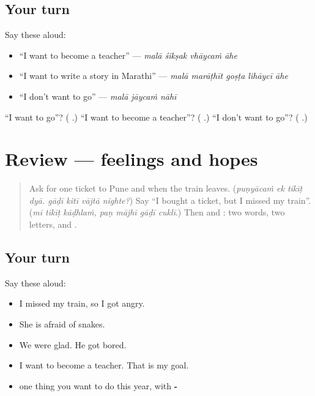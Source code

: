 \subsection*{Your turn}
Say these aloud:

\begin{itemize}
\raggedright
  \item \textquotedblleft{}I want to become a teacher\textquotedblright{} — \emph{malā śikṣak vhāycaṁ āhe}
  \item \textquotedblleft{}I want to write a story in Marathi\textquotedblright{} — \emph{malā marāṭhīt goṣṭa lihāycī āhe}
  \item \textquotedblleft{}I don't want to go\textquotedblright{} — \emph{malā jāycaṁ nāhī}
\end{itemize}

\begin{tcolorbox}[breakable,colback=teal!4,colframe=teal!35!black,title={Before you move on}]
\textquotedblleft{}I want to go\textquotedblright{}? (\textbf{  }.) \textquotedblleft{}I want to become a teacher\textquotedblright{}? (\textbf{   }.) \textquotedblleft{}I don't want to go\textquotedblright{}? (\textbf{  }.)
\end{tcolorbox}
\section[(review)]{Review — feelings and hopes}

\label{lesson:MR-R284-feelings-and-hopes}



\begin{quote}
Ask for one ticket to Pune and when the train leaves. (\emph{puṇyācaṁ ek tikīṭ dyā. gāḍī kitī vājtā nighte?}) Say \textquotedblleft{}I bought a ticket, but I missed my train\textquotedblright{}. (\emph{mī tikīṭ kāḍhlaṁ, paṇ mājhī gāḍī cuklī}.) Then \textbf{} and \textbf{}: two words, two letters, \textbf{} and \textbf{}.
\end{quote}

\subsection*{Your turn}
Say these aloud:

\begin{itemize}
\raggedright
  \item I missed my train, so I got angry.
  \item She is afraid of snakes.
  \item We were glad. He got bored.
  \item I want to become a teacher. That is my goal.
  \item one thing you want to do this year, with \textbf{- }
\end{itemize}

